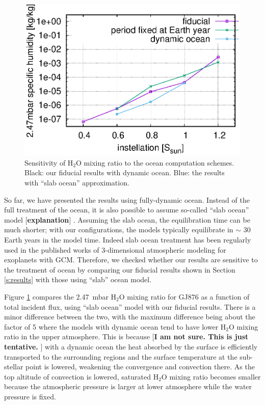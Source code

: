 \documentclass[11pt,numberedappendix,twocolappendix,]{emulateapj}
\def\water{H$_2$O }
\def\preslevel{2.47}
\def\memo#1{\color{red}$[${\bf #1}$]$ \color{black}}
\begin{document}
\begin{figure}[!h]
    \begin{center}
    \includegraphics[width=\hsize]{fig/AqOH0TLS_GJ876_q_sensitivity_changeS0X.eps}
    \end{center}
\caption{Sensitivity of \water mixing ratio to the ocean computation schemes. Black: our fiducial results with dynamic ocean. Blue: the results with ``slab ocean'' approximation. }
\label{fig:change_ocean}
\end{figure}

So far, we have presented the results using fully-dynamic ocean. 
Instead of the full treatment of the ocean, it is also possible to assume so-called ``slab ocean'' model \memo{explanation}. 
Assuming the slab ocean, the equilibration time can be much shorter; with our configurations, the models typically equilibrate in $\sim $ 30 Earth years in the model time. 
Indeed slab ocean treatment has been regularly used in the published works of 3-dimensional atmospheric modeling for exoplanets with GCM. 
Therefore, we checked whether our results are sensitive to the treatment of ocean by comparing our fiducial results shown in Section \ref{s:results} with those using ``slab'' ocean model. 

Figure \ref{fig:change_ocean} compares the \preslevel ~mbar \water mixing ratio for GJ876 as a function of total incident flux, using ``slab ocean'' model with our fiducial results. 
There is a minor difference between the two, with the maximum difference being about the factor of 5 where the models with dynamic ocean tend to have lower \water mixing ratio in the upper atmosphere. 
This is because \memo{I am not sure. This is just tentative. } with a dynamic ocean the heat absorbed by the surface is efficiently transported to the surrounding regions and the surface temperature at the sub-stellar point is lowered, weakening the convergence and convection there.
As the top altitude of convection is lowered, saturated \water mixing ratio becomes smaller because the atmospheric pressure is larger at lower atmosphere while the water pressure is fixed. 
\end{document}
